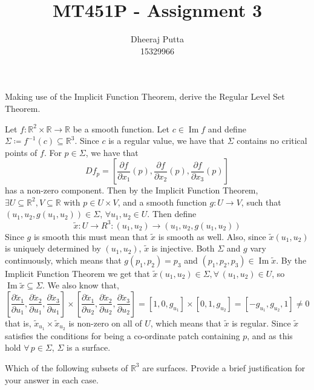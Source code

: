 \documentclass[12pt, answers]{exam}
\title{MT451P - Assignment 3}
\author{Dheeraj Putta \\ 15329966}
\date{}
\DeclareMathOperator{\im}{Im}
\begin{document}
    \maketitle
    \begin{questions}
        \thispagestyle{foot}

        \question Making use of the Implicit Function Theorem, derive the Regular Level Set Theorem.
        \begin{solution}
            Let $f : \mathbb{R}^2 \times \mathbb{R} \rightarrow \mathbb{R}$ be a smooth function. Let $c \in \im f$ and define
            $\Sigma \coloneqq f^{-1}(c) \subseteq \mathbb{R}^3$. Since $c$ is a regular value, we have that $\Sigma$ contains
            no critical points of $f$. For $p \in \Sigma$, we have that
            \[ Df_p = \left[\frac{\partial f}{\partial x_1}(p), \frac{\partial f}{\partial x_2}(p), \frac{\partial f}{\partial x_3}(p)\right] \]
            has a non-zero component. Then by the Implicit Function Theorem, $\exists U \subseteq \mathbb{R}^2, V \subseteq \mathbb{R}$
            with $p \in U \times V$, and a smooth function $g:U \rightarrow V$, such that $(u_1, u_2, g(u_1, u_2)) \in \Sigma$,
            $\forall u_1, u_2 \in U$. Then define
            \[ \tilde{x}: U \rightarrow R^3 :  (u_1, u_2) \to (u_1, u_2, g(u_1, u_2))\]
            Since $g$ is smooth this must mean that $\tilde{x}$ is smooth as well. Also, since $\tilde{x}(u_1, u_2)$ is
            uniquely determined by $(u_1, u_2)$, $\tilde{x}$ is injective. Both $\Sigma$ and $g$ vary continuously, which
            means that $g(p_1, p_2) = p_3$ and $(p_1, p_2, p_3) \in \im \tilde{x}$. By the Implicit Function Theorem we
            get that $\tilde{x}(u_1, u_2) \in \Sigma, \forall \, (u_1, u_2) \in U$, so $\im \tilde{x} \subseteq \Sigma$.
            We also know that,
            \[ \left[ \frac{\partial\tilde{x}_1}{\partial u_1}, \frac{\partial\tilde{x}_2}{\partial u_1},  \frac{\partial\tilde{x}_3}{\partial u_1}\right]
            \times \left[ \frac{\partial\tilde{x}_1}{\partial u_2}, \frac{\partial\tilde{x}_2}{\partial u_2},  \frac{\partial\tilde{x}_3}{\partial u_2}\right]
             = [1, 0, g_{u_1}] \times [0, 1, g_{u_2}] = [-g_{u_1}, g_{u_2}, 1] \neq 0\]
            that is, $\tilde{x}_{u_1} \times \tilde{x}_{u_2}$ is non-zero on all of $U$, which means that $\tilde{x}$ is
            regular. Since $\tilde{x}$ satisfies the conditions for being a co-ordinate patch containing $p$, and as this
            hold $\forall \, p \in \Sigma$, $\Sigma$ is a surface.
        \end{solution}
        \pagebreak
        \question Which of the following subsets of $\mathbb{R}^3$ are surfaces. Provide a brief justification for your answer in
        each case.


\end{questions}
\end{document}
